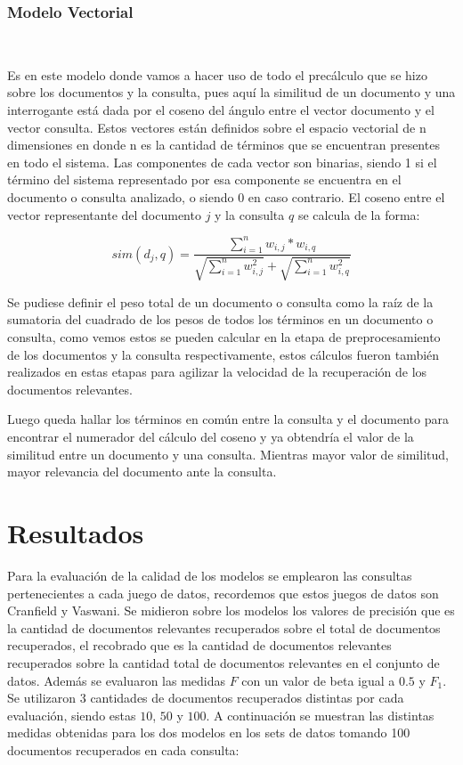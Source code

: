 \documentclass{llncs}
\begin{document}
\subsubsection{Modelo Vectorial}\

Es en este modelo donde vamos a hacer uso de todo el precálculo que se hizo sobre los documentos y la consulta, pues aquí la similitud de un documento y una interrogante está dada por el coseno del ángulo entre el vector documento y el vector consulta. Estos vectores están definidos sobre el espacio vectorial de n dimensiones en donde n es la cantidad de términos que se encuentran presentes en todo el sistema. Las componentes de cada vector son binarias, siendo 1 si el término del sistema representado por esa componente se encuentra en el documento o consulta analizado, o siendo 0 en caso contrario. El coseno entre el vector representante del documento $j$ y la consulta $q$ se calcula de la forma:

\begin{equation}
    sim(d_j, q) = \frac{\sum_{i = 1}^n w_{i, j} * w_{i, q}}{\sqrt{\sum_{i = 1}^n w^2_{i, j}} + \sqrt{\sum_{i = 1}^n w^2_{i, q}}}
\end{equation}

Se pudiese definir el peso total de un documento o consulta como la raíz de la sumatoria del cuadrado de los pesos de todos los términos en un documento o consulta, como vemos estos se pueden calcular en la etapa de preprocesamiento de los documentos y la consulta respectivamente, estos cálculos fueron también realizados en estas etapas para agilizar la velocidad de la recuperación de los documentos relevantes.

Luego queda hallar los términos en común entre la consulta y el documento para encontrar el numerador del cálculo del coseno y ya obtendría el valor de la similitud entre un documento y una consulta. Mientras mayor valor de similitud, mayor relevancia del documento ante la consulta.

\section{Resultados}

Para la evaluación de la calidad de los modelos se emplearon las consultas pertenecientes a cada juego de datos, recordemos que estos juegos de datos son Cranfield y Vaswani. Se midieron sobre los modelos los valores de precisión que es la cantidad de documentos relevantes recuperados sobre el total de documentos recuperados, el recobrado que es la cantidad de documentos relevantes recuperados sobre la cantidad total de documentos relevantes en el conjunto de datos. Además se evaluaron las medidas $F$ con un valor de beta igual a $0.5$ y $F_1$. Se utilizaron 3 cantidades de documentos recuperados distintas por cada evaluación, siendo estas $10$, $50$ y $100$. A continuación se muestran las distintas medidas obtenidas para los dos modelos en los sets de datos tomando 100 documentos recuperados en cada consulta:
\end{document}
